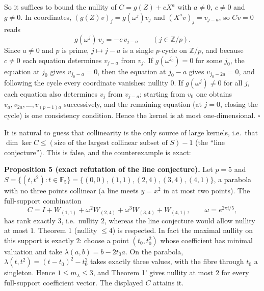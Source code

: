 \documentclass[
  11pt,
  a4paper,
]{article}
\begin{document}
So it suffices to bound the nullity of \(C=g(Z)+cX^a\) with \(a\ne0\),
\(c\ne0\) and \(g\ne0\). In coordinates, \((g(Z)v)_j=g(\omega^j)v_j\)
and \((X^av)_j=v_{j-a}\), so \(Cv=0\) reads
\[g(\omega^j)\,v_j=-c\,v_{j-a}\qquad(j\in\mathbb Z/p).\] Since \(a\ne0\)
and \(p\) is prime, \(j\mapsto j-a\) is a single \(p\)-cycle on
\(\mathbb Z/p\), and because \(c\ne0\) each equation determines
\(v_{j-a}\) from \(v_j\). If \(g(\omega^{j_0})=0\) for some \(j_0\), the
equation at \(j_0\) gives \(v_{j_0-a}=0\), then the equation at
\(j_0-a\) gives \(v_{j_0-2a}=0\), and following the cycle every
coordinate vanishes: nullity \(0\). If \(g(\omega^j)\ne0\) for all
\(j\), each equation also determines \(v_j\) from \(v_{j-a}\); starting
from \(v_0\) one obtains \(v_a,\allowbreak{}v_{2a},\allowbreak{}\dots,\allowbreak{}v_{(p-1)a}\) successively,
and the remaining equation (at \(j=0\), closing the cycle) is one
consistency condition. Hence the kernel is at most one-dimensional.
\(\square\)

It is natural to guess that collinearity is the only source of large
kernels, i.e.~that
\(\dim\ker C\le(\text{size of the largest collinear subset of }S)-1\)
(the ``line conjecture''). This is false, and the counterexample is
exact:

\textbf{Proposition 5 (exact refutation of the line conjecture).} Let
\(p=5\) and
\(S=\{(t,\allowbreak{}t^2):t\in\mathbb F_5\}=\{(0,\allowbreak{}0),\allowbreak{}(1,\allowbreak{}1),\allowbreak{}(2,\allowbreak{}4),\allowbreak{}(3,\allowbreak{}4),\allowbreak{}(4,\allowbreak{}1)\}\), a
parabola with no three points collinear (a line meets \(y=x^2\) in at
most two points). The full-support combination
\[C=I+W_{(1,1)}+\omega^2W_{(2,4)}+\omega^3W_{(3,4)}+W_{(4,1)},\qquad\omega=e^{2\pi i/5},\]
has rank exactly \(3\), i.e.~nullity \(2\), whereas the line conjecture
would allow nullity at most \(1\). Theorem 1 (nullity \(\le4\)) is
respected. In fact the maximal nullity on this support is exactly \(2\):
choose a point \((t_0,\allowbreak{}t_0^2)\) whose coefficient has minimal valuation
and take \(\lambda(a,\allowbreak{}b)=b-2t_0a\). On the parabola,
\(\lambda(t,\allowbreak{}t^2)=(t-t_0)^2-t_0^2\) takes exactly three values, with the
fibre through \(t_0\) a singleton. Hence \(1\le m_\lambda\le3\), and
Theorem 1' gives nullity at most \(2\) for every full-support
coefficient vector. The displayed \(C\) attains it.
\end{document}
